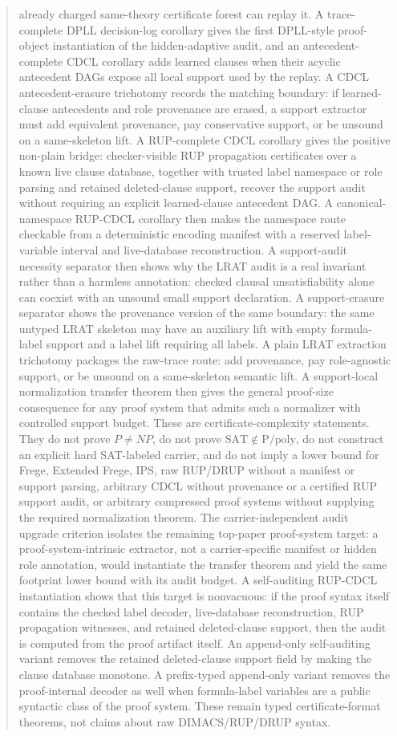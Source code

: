 \documentclass[11pt]{article}
\theoremstyle{definition}
\newcommand{\SAT}{\mathrm{SAT}}
\newcommand{\Ppoly}{\mathrm{P/poly}}
\begin{document}
\begin{abstract}
already charged same-theory certificate forest can replay it.  A trace-complete DPLL decision-log corollary gives the first DPLL-style proof-object instantiation of the hidden-adaptive audit, and an antecedent-complete CDCL corollary adds learned clauses when their acyclic antecedent DAGs expose all local support used by the replay.  A CDCL antecedent-erasure trichotomy records the matching boundary: if learned-clause antecedents and role provenance are erased, a support extractor must add equivalent provenance, pay conservative support, or be unsound on a same-skeleton lift.  A RUP-complete CDCL corollary gives the positive non-plain bridge: checker-visible RUP propagation certificates over a known live clause database, together with trusted label namespace or role parsing and retained deleted-clause support, recover the support audit without requiring an explicit learned-clause antecedent DAG.  A canonical-namespace RUP-CDCL corollary then makes the namespace route checkable from a deterministic encoding manifest with a reserved label-variable interval and live-database reconstruction.  A support-audit necessity separator then shows why the LRAT audit is a real invariant rather than a harmless annotation: checked clausal unsatisfiability alone can coexist with an unsound small support declaration.  A support-erasure separator shows the provenance version of the same boundary: the same untyped LRAT skeleton may have an auxiliary lift with empty formula-label support and a label lift requiring all labels.  A plain LRAT extraction trichotomy packages the raw-trace route: add provenance, pay role-agnostic support, or be unsound on a same-skeleton semantic lift.  A support-local normalization transfer theorem then gives the general proof-size consequence for any proof system that admits such a normalizer with controlled support budget.  These are certificate-complexity statements.  They do not prove $P\ne NP$, do not prove $\SAT\notin\Ppoly$, do not construct an explicit hard SAT-labeled carrier, and do not imply a lower bound for Frege, Extended Frege, IPS, raw RUP/DRUP without a manifest or support parsing, arbitrary CDCL without provenance or a certified RUP support audit, or arbitrary compressed proof systems without supplying the required normalization theorem.
The carrier-independent audit upgrade criterion isolates the remaining top-paper
proof-system target: a proof-system-intrinsic extractor, not a carrier-specific
manifest or hidden role annotation, would instantiate the transfer theorem and
yield the same footprint lower bound with its audit budget.
A self-auditing RUP-CDCL instantiation shows that this target is nonvacuous:
if the proof syntax itself contains the checked label decoder, live-database
reconstruction, RUP propagation witnesses, and retained deleted-clause support,
then the audit is computed from the proof artifact itself.  An append-only
self-auditing variant removes the retained deleted-clause support field by
making the clause database monotone.  A prefix-typed append-only variant removes
the proof-internal decoder as well when formula-label variables are a public
syntactic class of the proof system.  These remain typed certificate-format
theorems, not claims about raw DIMACS/RUP/DRUP
syntax.
\end{abstract}
\end{document}
